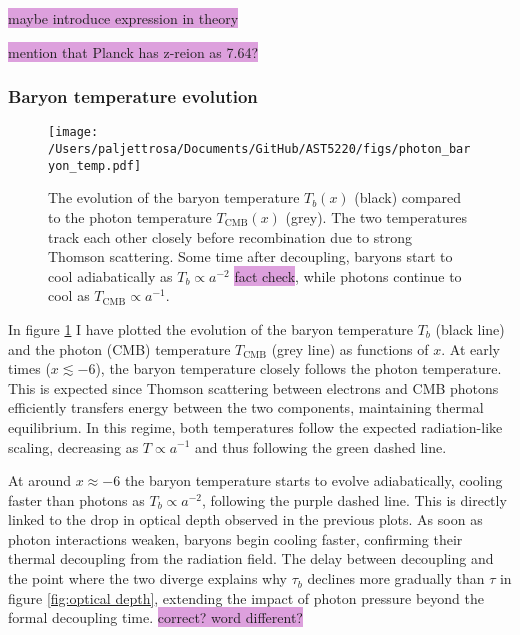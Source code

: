 \documentclass{aa}
\begin{document}
\colorbox{Plum}{maybe introduce expression in theory}

\colorbox{Plum}{mention that Planck has z-reion as 7.64?}




\subsubsection{Baryon temperature evolution}

\begin{figure}
  \centering
  \texttt{[image: /Users/paljettrosa/Documents/GitHub/AST5220/figs/photon\_baryon\_temp.pdf]}
  \caption{The evolution of the baryon temperature $T_b(x)$ (black) compared to the photon temperature $T_\text{CMB}(x)$ (grey). The two temperatures track each other closely before recombination due to strong Thomson scattering. Some time after decoupling, baryons start to cool adiabatically as $T_b \propto a^{-2}$ \colorbox{Plum}{fact check}, while photons continue to cool as $T_\text{CMB} \propto a^{-1}$.}\label{fig:baryon temperature}
\end{figure}

In figure \ref{fig:baryon temperature} I have plotted the evolution of the baryon temperature $T_b$ (black line) and the photon (CMB) temperature $T_\text{CMB}$ (grey line) as functions of $x$. At early times ($x \lesssim -6$), the baryon temperature closely follows the photon temperature. This is expected since Thomson scattering between electrons and CMB photons efficiently transfers energy between the two components, maintaining thermal equilibrium. In this regime, both temperatures follow the expected radiation-like scaling, decreasing as $T\propto a^{-1}$ and thus following the green dashed line. 

At around $x\approx-6$ the baryon temperature starts to evolve adiabatically, cooling faster than photons as $T_b\propto a^{-2}$, following the purple dashed line. This is directly linked to the drop in optical depth observed in the previous plots. As soon as photon interactions weaken, baryons begin cooling faster, confirming their thermal decoupling from the radiation field. The delay between decoupling and the point where the two diverge explains why $\tau_b$ declines more gradually than $\tau$ in figure \ref{fig:optical depth}, extending the impact of photon pressure beyond the formal decoupling time. \colorbox{Plum}{correct? word different?} 
\end{document}
